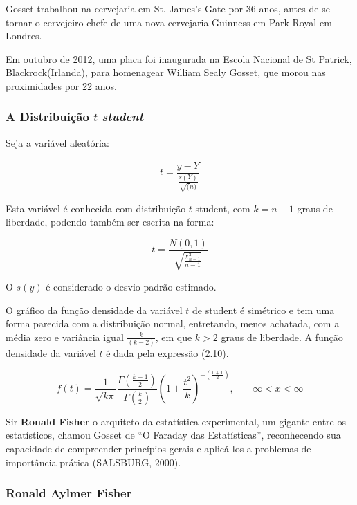 Gosset trabalhou na cervejaria em St. James's Gate por 36 anos, antes de se tornar o cervejeiro-chefe de uma nova cervejaria Guinness em Park Royal em Londres.\vskip0.3cm

Em outubro de 2012, uma placa foi inaugurada na Escola Nacional de St Patrick, Blackrock(Irlanda), para homenagear William Sealy Gosset, que morou nas proximidades por 22 anos. \vskip0.3cm



\subsubsection{A Distribuição $t$ \textit{student}}

Seja a variável aleatória:

\begin{equation}
    t =\frac{\overline{y}-\overline{Y}}{\frac{s(Y)}{\sqrt(n)}}
\end{equation}

Esta variável é conhecida com distribuição $t$ student, com $k=n-1$ graus de liberdade, podendo também ser escrita na forma:

\begin{equation}
    t =\frac{N(0,1)}{\sqrt{\frac{\chi^{2}_{n-1}}{n-1}}}
\end{equation}

O $s(y)$ é considerado o desvio-padrão estimado.\vskip0.3cm

O gráfico da função densidade da variável $t$ de student é simétrico e tem uma forma parecida com a distribuição normal, entretando, menos achatada, com a média zero e variância igual $\frac{k}{(k-2)}$, em que $k>2$ graus de liberdade. A função densidade da variável $t$ é dada pela expressão (2.10). 

\begin{equation}
f\left(t\right)=\frac{1}{\sqrt{k \pi}}\frac{\Gamma\left(\frac{k+1}{2}\right) }{\Gamma \left(\frac{k}{2}\right)}\left(1+\frac{t^2}{k}\right)^{-\left(\frac{\upsilon+1}{2}\right)},~~~-\infty<x<\infty
\end{equation}

Sir \textbf{Ronald Fisher} o arquiteto da estatística experimental, um gigante entre os estatísticos, chamou Gosset de “O Faraday das Estatísticas”, reconhecendo sua capacidade de compreender princípios gerais e aplicá-los a problemas de importância prática (SALSBURG, 2000).


\newpage
\subsubsection{Ronald Aylmer Fisher}

